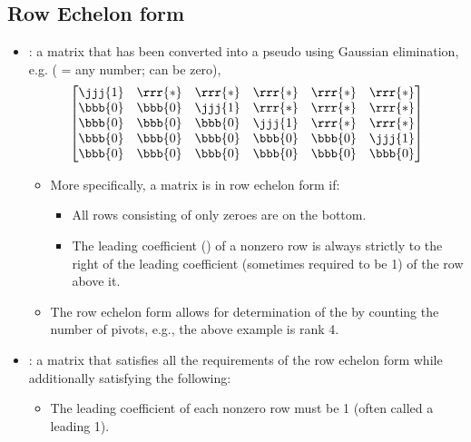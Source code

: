 \begin{itemize}
  \subsection{Row Echelon form}\label{Row Echelon form}
  \begin{itemize}
    \item {}: a matrix that has been converted into a pseudo \hyperref[Diagonal and Triagnular Matrices]{} using Gaussian elimination, e.g. (\rrr{*} = any number; can be zero),
    \[%
    \begin{bmatrix}
      \jjj{1} & \rrr{*} & \rrr{*} & \rrr{*} & \rrr{*} & \rrr{*} \\
      \bbb{0} & \bbb{0} & \jjj{1} & \rrr{*} & \rrr{*} & \rrr{*} \\
      \bbb{0} & \bbb{0} & \bbb{0} & \jjj{1} & \rrr{*} & \rrr{*} \\
      \bbb{0} & \bbb{0} & \bbb{0} & \bbb{0} & \bbb{0} & \jjj{1} \\
      \bbb{0} & \bbb{0} & \bbb{0} & \bbb{0} & \bbb{0} & \bbb{0} \\
    \end{bmatrix}
    \]%
    \begin{itemize}
      \item More specifically, a matrix is in row echelon form if:
      \begin{itemize}
        \item All rows consisting of only zeroes are on the bottom.
        \item The leading coefficient () of a nonzero row is always strictly to the right of the leading coefficient (sometimes required to be 1) of the row above it. 
      \end{itemize}
      \item The row echelon form allows for determination of the \hyperref[Matrix Rank]{} by counting the number of pivots, e.g., the above example is rank 4.
    \end{itemize}
    \item {} : a matrix that satisfies all the requirements of the row echelon form while additionally satisfying the following:
    \begin{itemize}
      \item The leading coefficient of each nonzero row must be 1 (often called a leading 1). 

\end{itemize}
\end{itemize}
\end{itemize}
